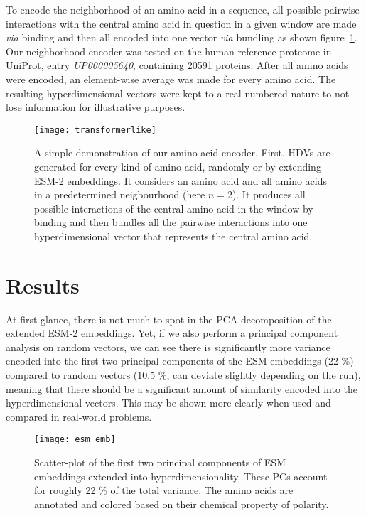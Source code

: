 To encode the neighborhood of an amino acid in a sequence, all possible pairwise interactions with the central amino acid in question in a given window are made \textit{via} binding and then all encoded into one vector \textit{via} bundling as shown figure~\ref{fig:AAtr}. Our neighborhood-encoder was tested on the human reference proteome in UniProt, entry \textit{UP000005640}, containing 20591 proteins. After all amino acids were encoded, an element-wise average was made for every amino acid. The resulting hyperdimensional vectors were kept to a real-numbered nature to not lose information for illustrative purposes.

\begin{figure}[H]
    \centering
    \texttt{[image: transformerlike]}
    \caption{A simple demonstration of our amino acid encoder. First, HDVs are generated for every kind of amino acid, randomly or by extending ESM-2 embeddings. It considers an amino acid and all amino acids in a predetermined neigbourhood (here $n = 2$). It produces all possible interactions of the central amino acid in the window by binding and then bundles all the pairwise interactions into one hyperdimensional vector that represents the central amino acid.}
    \label{fig:AAtr}
\end{figure}


\section{Results}
At first glance, there is not much to spot in the PCA decomposition of the extended ESM-2 embeddings. Yet, if we also perform a principal component analysis on random vectors, we can see there is significantly more variance encoded into the first two principal components of the ESM embeddings (22 \%) compared to random vectors (10.5 \%, can deviate slightly depending on the run), meaning that there should be a significant amount of similarity encoded into the hyperdimensional vectors. This may be shown more clearly when used and compared in real-world problems.

\begin{figure}[H]
    \centering
    \texttt{[image: esm\_emb]}
    \caption{Scatter-plot of the first two principal components of ESM embeddings extended into hyperdimensionality. These PCs account for roughly 22 \% of the total variance. The amino acids are annotated and colored based on their chemical property of polarity.}\label{fig:AAesm}
\end{figure}

